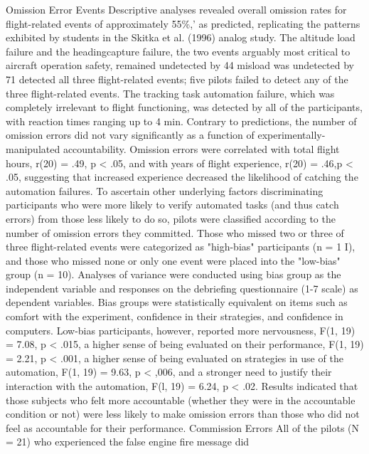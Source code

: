 \documentclass[utf8,bachelor,manualbib]{gradu3}
\begin{document}
Omission Error Events
Descriptive analyses revealed overall omission rates for flight-related events of
approximately 55\%,' as predicted, replicating the patterns exhibited by students in
the Skitka et al. (1996) analog study. The altitude load failure and the headingcapture failure, the two events arguably most critical to aircraft operation safety,
remained undetected by 44%
misload was undetected by 71%
detected all three flight-related events; five pilots failed to detect any of the three
flight-related events. The tracking task automation failure, which was completely
irrelevant to flight functioning, was detected by all of the participants, with reaction
times ranging up to 4 min.
Contrary to predictions, the number of omission errors did not vary significantly
as a function of experimentally-manipulated accountability. Omission errors were
correlated with total flight hours, r(20) = .49, p < .05, and with years of flight
experience, r(20) = .46,p < .05, suggesting that increased experience decreased the
likelihood of catching the automation failures. To ascertain other underlying factors
discriminating participants who were more likely to verify automated tasks (and
thus catch errors) from those less likely to do so, pilots were classified according
to the number of omission errors they committed. Those who missed two or three
of three flight-related events were categorized as "high-bias" participants (n = 1 I),
and those who missed none or only one event were placed into the "low-bias" group
(n = 10). Analyses of variance were conducted using bias group as the independent
variable and responses on the debriefing questionnaire (1-7 scale) as dependent
variables.
Bias groups were statistically equivalent on items such as comfort with the
experiment, confidence in their strategies, and confidence in computers. Low-bias
participants, however, reported more nervousness, F(1, 19) = 7.08, p < .015, a
higher sense of being evaluated on their performance, F(1, 19) = 2.21, p < .001, a
higher sense of being evaluated on strategies in use of the automation, F(1, 19) =
9.63, p < ,006, and a stronger need to justify their interaction with the automation,
F(l, 19) = 6.24, p < .02. Results indicated that those subjects who felt more
accountable (whether they were in the accountable condition or not) were less likely
to make omission errors than those who did not feel as accountable for their
performance. Commission Errors
All of the pilots (N = 21) who experienced the false engine fire message did
\end{document}

